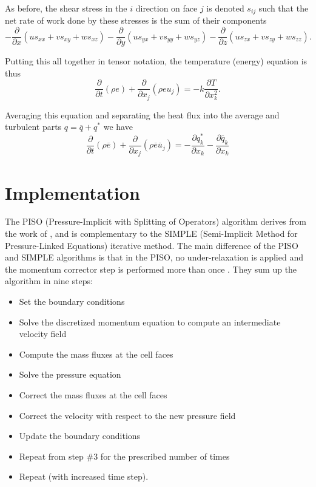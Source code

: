 \documentclass[12pt]{report}
\begin{document}
As before, the shear stress in the $i$ direction on face $j$ is denoted $s_{ij}$ such that the net rate of work done by these stresses is the sum of their components
\begin{equation} - \frac{\partial }{\partial x} \left ( u s_{xx} + v s_{xy} + w s_{xz} \right) - \frac{\partial }{\partial y} \left (u s_{yx} + v s_{yy} + w s_{yz} \right) - \frac{\partial }{\partial z}\left (u s_{zx} + v s_{zy} + w s_{zz} \right) \label{eq:energy6}.\end{equation}

Putting this all together in tensor notation, the temperature (energy) equation is thus
\begin{equation} \frac{\partial }{\partial t} \left ( \rho e\right ) + \frac{\partial}{\partial x_j} \left ( \rho e u_j \right ) 
= 
-k \frac{\partial T}{\partial x_k^2}.
\end{equation}

Averaging this equation and separating the heat flux into the average and turbulent parts $q = \overline{q} + q^*$ we have
\begin{equation} \frac{\partial }{\partial t} \left ( \rho \overline{e}\right ) + \frac{\partial}{\partial x_j} \left ( \rho \overline{e} \overline{u}_j \right ) 
= 
- \frac{\partial q_k^*}{\partial x_k}
- \frac{\partial \overline{q}_k}{\partial x_k}
\end{equation}

\section{Implementation}

The PISO (Pressure-Implicit with Splitting of Operators) algorithm derives from the work of , and is complementary to the SIMPLE (Semi-Implicit Method for Pressure-Linked Equations)  iterative method.
The main difference of the PISO and SIMPLE algorithms is that in the PISO, no under-relaxation is applied and the momentum corrector step is performed more than once .
They sum up the algorithm in nine steps:
\begin{itemize}
\item Set the boundary conditions
\item Solve the discretized momentum equation to compute an intermediate velocity field
\item Compute the mass fluxes at the cell faces
\item Solve the pressure equation
\item Correct the mass fluxes at the cell faces
\item Correct the velocity with respect to the new pressure field
\item Update the boundary conditions
\item Repeat from step \#3 for the prescribed number of times
\item Repeat (with increased time step).
\end{itemize}
\end{document}
